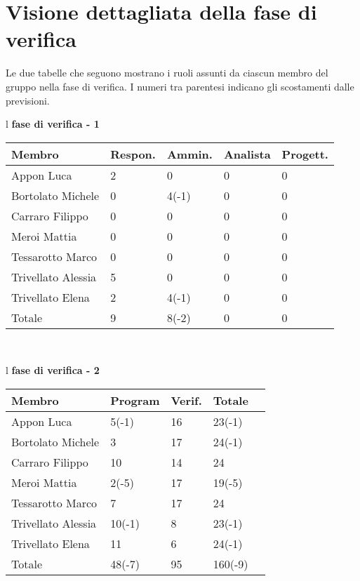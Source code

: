 \section{Visione dettagliata della fase di verifica}
Le due tabelle che seguono mostrano i ruoli assunti da ciascun membro del gruppo nella fase di verifica. I numeri tra parentesi indicano gli scostamenti dalle previsioni.
\begin{table}[hbtp]
\large{
\begin{tabular}{l}
\Large{\textbf{\textsf{fase di verifica - 1}}} \\
\begin{tabular}{||p{3.5cm}||p{2cm}||p{2cm}||p{2cm}||p{2cm}||} \hline
\textbf{Membro} & \textbf{Respon.} & \textbf{Ammin.} & \textbf{Analista} & \textbf{Progett.}\\ \hline
{Appon Luca}&2&0&0&0 \\ \hline 
{Bortolato Michele} &0&4\footnotesize{(-1)}&0&0\\ \hline
{Carraro Filippo}&0&0&0&0 \\ \hline
{Meroi Mattia}&0&0&0&0\\ \hline
{Tessarotto Marco} &0&0&0&0\\ \hline
{Trivellato Alessia} &5&0&0&0 \\ \hline
{Trivellato Elena} &2&4\footnotesize{(-1)}&0&0 \\ \hline
{Totale}& 9&8\footnotesize{(-2)}&0&0 \\ \hline
\end{tabular} \\
\end{tabular}
}
\end{table}

\begin{table}[hbtp]
\large{
\begin{tabular}{l}
\Large{\textbf{\textsf{fase di verifica - 2}}} \\
\begin{tabular}{||p{3.5cm}||p{2cm}||p{2cm}||p{2cm}||p{2cm}||} \hline
\textbf{Membro} & \textbf{Program} & \textbf{Verif.} & \textbf{Totale}\\ \hline
{Appon Luca}&5\footnotesize{(-1)}&16&23\footnotesize{(-1)} \\ \hline
{Bortolato Michele} &3&17&24\footnotesize{(-1)}\\ \hline
{Carraro Filippo}&10&14&24 \\ \hline
{Meroi Mattia}&2\footnotesize{(-5)}&17&19\footnotesize{(-5)}\\ \hline
{Tessarotto Marco} &7&17&24\\ \hline
{Trivellato Alessia} &10\footnotesize{(-1)}&8&23\footnotesize{(-1)} \\ \hline
{Trivellato Elena} &11&6&24\footnotesize{(-1)} \\ \hline
{Totale} &48\footnotesize{(-7)}&95&160\footnotesize{(-9)} \\ \hline
\end{tabular} \\
\end{tabular}
}
\end{table}


